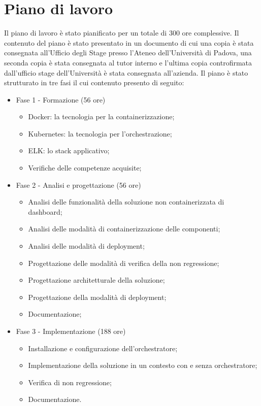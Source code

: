 \section{Piano di lavoro}
\label{sec:piano-di-lavoro}
Il piano di lavoro è stato pianificato per un totale di 300 ore complessive. Il 
contenuto del piano è stato presentato in un documento di cui una copia è stata 
consegnata all'Ufficio degli Stage presso l'Ateneo dell'Università di Padova, 
una seconda copia è stata consegnata al tutor interno e l'ultima copia 
controfirmata dall'ufficio stage dell'Università è stata consegnata all'azienda. 
Il piano è stato strutturato in tre fasi il cui contenuto presento di seguito:
\begin{itemize}
\item Fase 1 - Formazione  (56 ore)
	\begin{itemize}
		\item Docker: la tecnologia per la containerizzazione;
		\item Kubernetes: la tecnologia per l'orchestrazione;
		\item ELK: lo stack applicativo;
		\item Verifiche delle competenze acquisite;
	\end{itemize}
\item Fase 2 - Analisi e progettazione  (56 ore)
	\begin{itemize}
		\item Analisi delle funzionalità della soluzione non containerizzata di dashboard;
		\item Analisi delle modalità di containerizzazione delle componenti;
		\item Analisi delle modalità di \gls{deployment};
		\item Progettazione delle modalità di verifica della non regressione;
		\item Progettazione architetturale della soluzione; 
		\item Progettazione della modalità di \gls{deployment};
		\item Documentazione;
	\end{itemize}
\item Fase 3 - Implementazione  (188 ore)	
	\begin{itemize}
		\item Installazione e configurazione dell'orchestratore;
		\item Implementazione della soluzione in un contesto con e senza orchestratore;
		\item Verifica di non regressione;
		\item Documentazione.
	\end{itemize}
\end{itemize}

